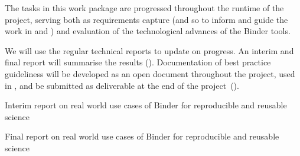 \begin{workpackage}
\begin{wpdescription}
  \medskip

  The tasks in this work package are progressed throughout the runtime of the
  project, serving both as requirements capture (and so to inform and guide the
  work in  and ) and evaluation of the
  technological advances of the Binder tools.

  We will use the regular technical reports to update on progress. An
  interim  and final
  report will summarise the results ().
  Documentation of best practice guideliness will be developed as an open
  document throughout the project, used in , and be submitted
  as deliverable at the end of the project~().
\end{wpdescription}

\begin{tasklist}


%



\end{tasklist}


\begin{wpdelivs}
  \begin{wpdeliv}[
    id=report-use-cases-interim,
    lead=MP,
    due=18,
    dissem=PU,
    nature=DEC,
    ]
    {
      Interim report on real world use cases of Binder for reproducible and reusable science
    }
  \end{wpdeliv}

  \begin{wpdeliv}[
    id=report-use-cases,
    lead=MP,
    due=34,
    dissem=PU,
    nature=DEC,
    ]
    {
      Final report on real world use cases of Binder for reproducible and reusable science
    }
  \end{wpdeliv}



\end{wpdelivs}
\end{workpackage}

